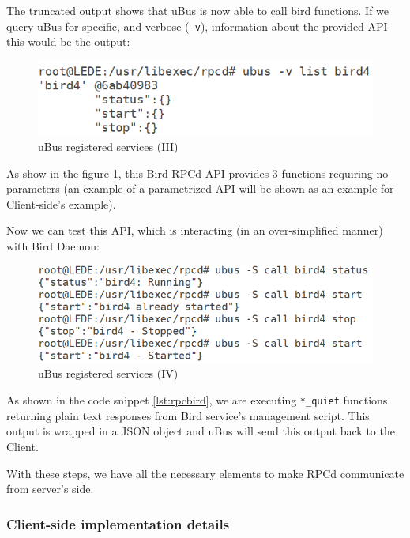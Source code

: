 The truncated output shows that uBus is now able to call bird functions. If we query uBus for specific, and verbose (\texttt{-v}), information about the provided API this would be the output:

\begin{figure}[H]
    \centering
    \includegraphics[width=\textwidth]{images/luci2/step3}
    \caption{uBus registered services (III)}
    \label{fig:ubusrs3}
\end{figure}

As show in the figure \ref{fig:ubusrs3}, this Bird RPCd API provides 3 functions requiring no parameters (an example of a parametrized API will be shown as an example for Client-side's example).

Now we can test this API, which is interacting (in an over-simplified manner) with Bird Daemon:

\begin{figure}[H]
    \centering
    \includegraphics[width=\textwidth]{images/luci2/step4}
    \caption{uBus registered services (IV)}
    \label{fig:ubusrs4}
\end{figure}

As shown in the code snippet \ref{lst:rpcbird}, we are executing \texttt{*\_quiet} functions returning plain text responses from Bird service's management script. This output is wrapped in a JSON object and uBus will send this output back to the Client.

With these steps, we have all the necessary elements to make RPCd communicate from server's side.

\subsubsection{Client-side implementation details}

